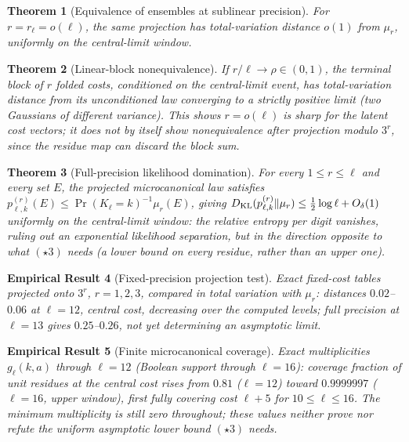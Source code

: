 \documentclass[11pt]{article}
\newtheorem{theorem}{Theorem}[section]
\newtheorem{empirical}[theorem]{Empirical Result}
\theoremstyle{definition}
\theoremstyle{remark}
\begin{document}
\begin{theorem}[Equivalence of ensembles at sublinear precision]
\label{thm:sublinear-precision-ensemble}
For $r=r_\ell=o(\ell)$, the same projection has total-variation
distance $o(1)$ from $\mu_r$, uniformly on the central-limit window.
\end{theorem}

\begin{theorem}[Linear-block nonequivalence]\label{thm:linear-block-nonequivalence}
If $r/\ell\to\rho\in(0,1)$, the terminal block of $r$ folded costs,
conditioned on the central-limit event, has total-variation distance
from its unconditioned law converging to a strictly positive limit
(two Gaussians of different variance). This shows $r=o(\ell)$ is sharp
for the latent cost vectors; it does not by itself show nonequivalence
after projection modulo $3^r$, since the residue map can discard the
block sum.
\end{theorem}

\begin{theorem}[Full-precision likelihood domination]
\label{thm:ensemble-divergence}
For every $1\le r\le\ell$ and every set $E$, the projected microcanonical
law satisfies $p_{\ell,k}^{(r)}(E)\le\Pr(K_\ell=k)^{-1}\mu_r(E)$, giving
$D_{\rm KL}(p_{\ell,k}^{(r)}\Vert\mu_r)\le\tfrac12\log\ell+O_\delta(1)$
uniformly on the central-limit window: the relative entropy per digit
vanishes, ruling out an exponential likelihood separation, but in the
direction opposite to what $(\star3)$ needs (a lower bound on every
residue, rather than an upper one).
\end{theorem}

\begin{empirical}[Fixed-precision projection test]
\label{thm:fixed-precision-finite}
Exact fixed-cost tables projected onto $3^r$, $r=1,2,3$, compared in
total variation with $\mu_r$: distances $0.02$--$0.06$ at $\ell=12$,
central cost, decreasing over the computed levels; full precision at
$\ell=13$ gives $0.25$--$0.26$, not yet determining an asymptotic
limit.
\end{empirical}

\begin{empirical}[Finite microcanonical coverage]\label{thm:microcanonical-finite}
Exact multiplicities $g_\ell(k,a)$ through $\ell=12$ (Boolean support
through $\ell=16$): coverage fraction of unit residues at the central
cost rises from $0.81$ ($\ell=12$) toward $0.9999997$ ($\ell=16$, upper
window), first fully covering cost $\ell+5$ for $10\le\ell\le16$. The
minimum multiplicity is still zero throughout; these values neither
prove nor refute the uniform asymptotic lower bound $(\star3)$ needs.
\end{empirical}
\end{document}
